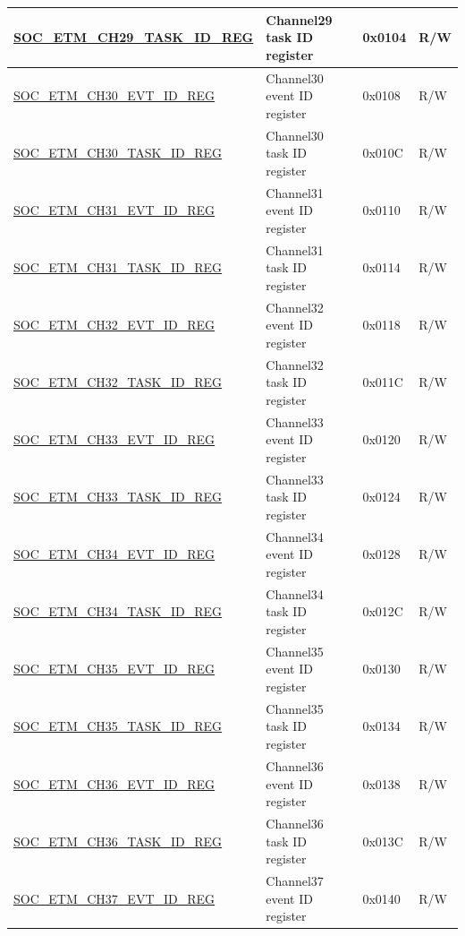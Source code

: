 \begin{longtable}{ | p{6cm} | p{6.4cm} | p{1.3cm} | p{1.8cm} | }
\hyperref[regdesc:SOCETMCH0TASKIDREG]{SOC\_ETM\_CH29\_TASK\_ID\_REG} & Channel29 task ID register & 0x0104 & R/W \\ \hline
\hyperref[regdesc:SOCETMCH0EVTIDREG]{SOC\_ETM\_CH30\_EVT\_ID\_REG} & Channel30 event ID register & 0x0108 & R/W \\ \hline
\hyperref[regdesc:SOCETMCH0TASKIDREG]{SOC\_ETM\_CH30\_TASK\_ID\_REG} & Channel30 task ID register & 0x010C & R/W \\ \hline
\hyperref[regdesc:SOCETMCH0EVTIDREG]{SOC\_ETM\_CH31\_EVT\_ID\_REG} & Channel31 event ID register & 0x0110 & R/W \\ \hline
\hyperref[regdesc:SOCETMCH0TASKIDREG]{SOC\_ETM\_CH31\_TASK\_ID\_REG} & Channel31 task ID register & 0x0114 & R/W \\ \hline
\hyperref[regdesc:SOCETMCH0EVTIDREG]{SOC\_ETM\_CH32\_EVT\_ID\_REG} & Channel32 event ID register & 0x0118 & R/W \\ \hline
\hyperref[regdesc:SOCETMCH0TASKIDREG]{SOC\_ETM\_CH32\_TASK\_ID\_REG} & Channel32 task ID register & 0x011C & R/W \\ \hline
\hyperref[regdesc:SOCETMCH0EVTIDREG]{SOC\_ETM\_CH33\_EVT\_ID\_REG} & Channel33 event ID register & 0x0120 & R/W \\ \hline
\hyperref[regdesc:SOCETMCH0TASKIDREG]{SOC\_ETM\_CH33\_TASK\_ID\_REG} & Channel33 task ID register & 0x0124 & R/W \\ \hline
\hyperref[regdesc:SOCETMCH0EVTIDREG]{SOC\_ETM\_CH34\_EVT\_ID\_REG} & Channel34 event ID register & 0x0128 & R/W \\ \hline
\hyperref[regdesc:SOCETMCH0TASKIDREG]{SOC\_ETM\_CH34\_TASK\_ID\_REG} & Channel34 task ID register & 0x012C & R/W \\ \hline
\hyperref[regdesc:SOCETMCH0EVTIDREG]{SOC\_ETM\_CH35\_EVT\_ID\_REG} & Channel35 event ID register & 0x0130 & R/W \\ \hline
\hyperref[regdesc:SOCETMCH0TASKIDREG]{SOC\_ETM\_CH35\_TASK\_ID\_REG} & Channel35 task ID register & 0x0134 & R/W \\ \hline
\hyperref[regdesc:SOCETMCH0EVTIDREG]{SOC\_ETM\_CH36\_EVT\_ID\_REG} & Channel36 event ID register & 0x0138 & R/W \\ \hline
\hyperref[regdesc:SOCETMCH0TASKIDREG]{SOC\_ETM\_CH36\_TASK\_ID\_REG} & Channel36 task ID register & 0x013C & R/W \\ \hline
\hyperref[regdesc:SOCETMCH0EVTIDREG]{SOC\_ETM\_CH37\_EVT\_ID\_REG} & Channel37 event ID register & 0x0140 & R/W \\ \hline

\end{longtable}

